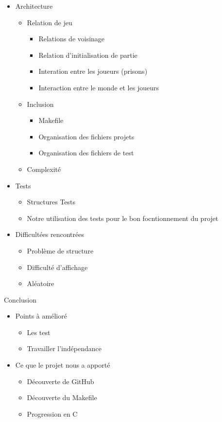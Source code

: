 \documentclass[10pt,a4paper,oneside]{report}
\begin{document}
\begin{itemize}
    
    \item Architecture 
    \begin{itemize}
        \item Relation de jeu 
        \begin{itemize}
            \item Relations de voisinage 
            \item Relation d'initialisation de partie 
            \item Interation entre les joueurs (prisons)
            \item Interaction entre le monde et les joueurs 
        \end{itemize}
        \item Inclusion
        \begin{itemize}
            \item Makefile
            \item Organisation des fichiers projets
            \item Organisation des fichiers de test
        \end{itemize}
        \item Complexité 
    \end{itemize}
    \item Tests 
    \begin{itemize}
        \item Structures Tests
        \item Notre utilisation des tests pour le bon focntionnement du projet 
    \end{itemize}
    \item Difficultées rencontrées 
    \begin{itemize}
        \item Problème de structure
        \item Difficulté d'affichage  
        \item Aléatoire 
    \end{itemize}
    \end{itemize}

Conclusion
\begin{itemize}
    \item Points à amélioré
    \begin{itemize}
        \item Les test
        \item Travailler l'indépendance 
        
    \end{itemize}
    \item Ce que le projet nous a apporté 
    \begin{itemize}
        \item Découverte de GitHub
        \item Découverte du Makefile
        \item Progression en C
        
    \end{itemize}
\end{itemize}
\end{document}
